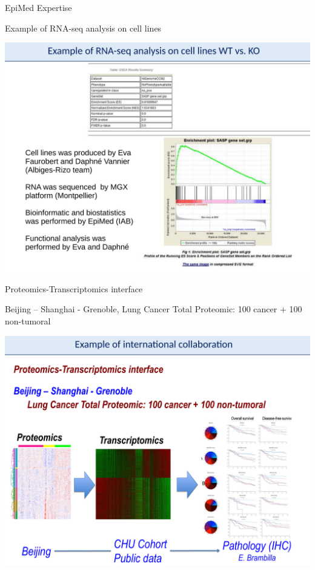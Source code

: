 \documentclass[final]{beamer}
\newlength{\twocolwid}
\begin{document}
\begin{frame}[t]
\begin{columns}[t]
\begin{column}{\twocolwid}
\begin{block}{EpiMed Expertise}
{}

\end{block}







\begin{block}{Example of RNA-seq analysis on cell lines}
{
\centering
\mbox{\includegraphics[trim = 0mm 0mm 0mm 43mm, clip, width=.66\linewidth]{figs/fig05}}

}
\end{block}











\begin{block}{Proteomics-Transcriptomics interface}

Beijing – Shanghai - Grenoble, Lung Cancer Total Proteomic: 100 cancer + 100 non-tumoral

{
\centering
\mbox{\includegraphics[trim = 0mm 0mm 0mm 63mm, clip, width=.66\linewidth]{figs/fig06}}

}
\end{block}






\end{column}
\end{columns}
\end{frame}
\end{document}
